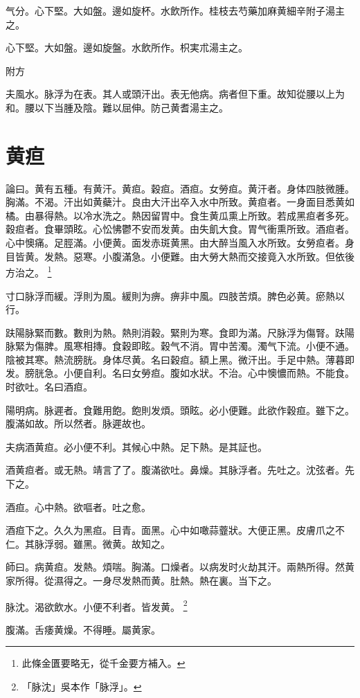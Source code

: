 \documentclass[b5paper,twoside,zihao=-4,UTF8]{ctexbook}
\begin{document}
气分。心下堅。大如盤。邊如旋杯。水飲所作。桂枝去芍藥加麻{黄細}辛附子湯主之。

心下堅。大如盤。邊如旋盤。水飲所作。枳{実}朮湯主之。

附方

夫風水。脉浮为在表。其人或頭汗出。表无他病。病者但下重。故知從腰以上为和。腰以下当腫及陰。難以屈伸。防己黄耆湯主之。

\chapter{黄疸}

論曰。黄有五種。有黄汗。黄疸。穀疸。酒疸。女勞疸。黄汗者。身体四肢微腫。胸滿。不渴。汗出如黄蘗汁。良由大汗出卒入水中所致。黄疸者。一身面目悉黄如橘。由暴得熱。以冷水洗之。熱因留胃中。食生黄瓜熏上所致。若成黑疸者多死。穀疸者。食畢頭眩。心忪怫鬱不安而发黄。由失飢大食。胃气衝熏所致。酒疸者。心中懊痛。足脛滿。小便黄。面发赤斑黄黑。由大醉当風入水所致。女勞疸者。身目皆黄。发熱。惡寒。小腹滿急。小便難。由大勞大熱而交接竟入水所致。但依後方治之。
	\footnote{此條金匱要略无，從千金要方補入。}

寸口脉浮而緩。浮則为風。緩則为痹。痹非中風。四肢苦煩。脾色必黄。瘀熱以行。

趺陽脉緊而數。數則为熱。熱則消穀。緊則为寒。食即为滿。尺脉浮为傷腎。趺陽脉緊为傷脾。風寒相摶。食穀即眩。穀气不消。胃中苦濁。濁气下流。小便不通。陰被其寒。熱流膀胱。身体尽黄。名曰穀疸。額上黑。微汗出。手足中熱。薄暮即发。膀胱急。小便自利。名曰女勞疸。腹如水狀。不治。心中懊憹而熱。不能食。时欲吐。名曰酒疸。

陽明病。脉遲者。食難用飽。飽則发煩。頭眩。必小便難。此欲作穀疸。雖下之。腹滿如故。所以然者。脉遲故也。

夫病酒黄疸。必小便不利。其候心中熱。足下熱。是其証也。

酒黄疸者。或无熱。靖言了{了}。腹滿欲吐。鼻燥。其脉浮者。先吐之。沈弦者。先下之。

酒疸。心中熱。欲嘔者。吐之愈。

酒疸下之。久久为黑疸。目青。面黑。心中如噉蒜虀狀。大便正黑。皮膚爪之不仁。其脉浮弱。雖黑。微黄。故知之。

師曰。病黄疸。发熱。煩喘。胸滿。口燥者。以病发时火劫其汗。兩熱所得。然黄家所得。從濕得之。一身尽发熱而黄。肚熱。熱在裏。当下之。

脉沈。渴欲飲水。小便不利者。皆发黄。
	\footnote{「脉沈」吳本作「脉浮」。}

腹滿。舌痿黄燥。不得睡。屬黄家。
\end{document}
